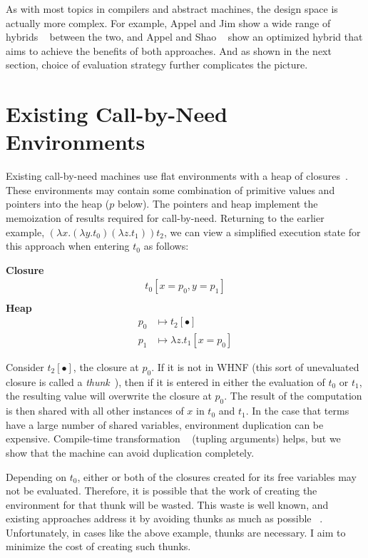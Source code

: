 As with most topics in compilers and abstract machines, the design space is
actually more complex. For example, Appel and Jim show a wide range of hybrids
~\cite{appel1988optimizing} between the two, and Appel and Shao
~\cite{shao1994space} show an optimized hybrid that aims to achieve the benefits
of both approaches. And as shown in the next section, choice of evaluation
strategy further complicates the picture.

\section{Existing Call-by-Need Environments} \label{sec:exist}

Existing call-by-need machines use flat environments with a heap of
closures~\cite{jonesstg,TIM,johnsson1984efficient,boquist1997grin}. These
environments may contain some combination of primitive values and pointers into the
heap ($p$ below). The pointers and heap implement the memoization of results
required for call-by-need. Returning to the earlier example, $(\lambda
x.(\lambda y.t_0) (\lambda z.t_1)) t_2$, we can view a simplified execution state
for this approach when entering $t_0$ as follows:

\begin{center}
\textbf{Closure}
\begin{align*}
t_0[x=p_0, y=p_1] \\
\end{align*}
\textbf{Heap}
\begin{align*}
p_0 &\mapsto t_2[\bullet] \\
p_1 &\mapsto \lambda z.t_1[x=p_0] 
\end{align*}
\end{center}

Consider $t_2[\bullet]$, the closure at $p_0$. If it is not in WHNF (this sort
of unevaluated closure is called a
\emph{thunk}~\cite{ingerman1961way,peyton1992implementing}), then if it is
entered in either the evaluation of $t_0$ or $t_1$, the resulting value will
overwrite the closure at $p_0$. The result of the computation is then shared
with all other instances of $x$ in $t_0$ and $t_1$. In the case that terms have a
large number of shared variables, environment duplication can be expensive.
Compile-time transformation ~\cite{peyton1992implementing} (tupling arguments)
helps, but we show that the machine can avoid duplication completely.

Depending on $t_0$, either or both of the closures created for its free variables
may not be evaluated. Therefore, it is possible that the work of creating the
environment for that thunk will be wasted. This waste is well known, and
existing approaches address it by avoiding thunks as much as possible
~\cite{jonesstg,johnsson1984efficient}. Unfortunately, in cases like the above
example, thunks are necessary. I aim to minimize the cost of creating such
thunks.

